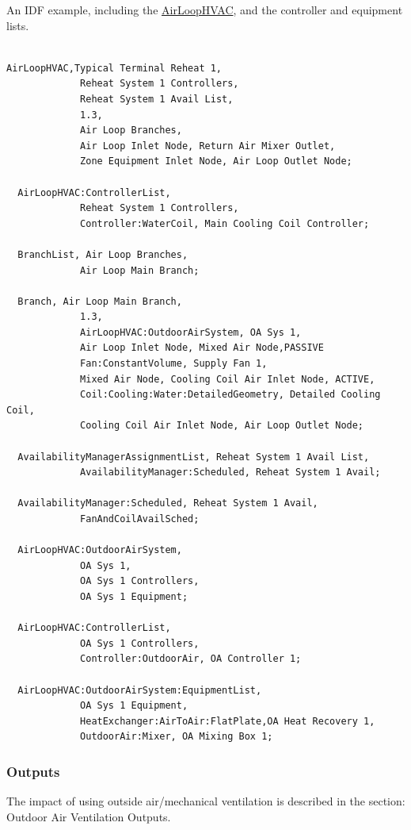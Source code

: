 An IDF example, including the \hyperref[airloophvac]{AirLoopHVAC}, and the controller and equipment lists.

\begin{lstlisting}

AirLoopHVAC,Typical Terminal Reheat 1,
             Reheat System 1 Controllers,
             Reheat System 1 Avail List,
             1.3,
             Air Loop Branches,
             Air Loop Inlet Node, Return Air Mixer Outlet,
             Zone Equipment Inlet Node, Air Loop Outlet Node;

  AirLoopHVAC:ControllerList,
             Reheat System 1 Controllers,
             Controller:WaterCoil, Main Cooling Coil Controller;

  BranchList, Air Loop Branches,
             Air Loop Main Branch;

  Branch, Air Loop Main Branch,
             1.3,
             AirLoopHVAC:OutdoorAirSystem, OA Sys 1,
             Air Loop Inlet Node, Mixed Air Node,PASSIVE
             Fan:ConstantVolume, Supply Fan 1,
             Mixed Air Node, Cooling Coil Air Inlet Node, ACTIVE,
             Coil:Cooling:Water:DetailedGeometry, Detailed Cooling Coil,
             Cooling Coil Air Inlet Node, Air Loop Outlet Node;

  AvailabilityManagerAssignmentList, Reheat System 1 Avail List,
             AvailabilityManager:Scheduled, Reheat System 1 Avail;

  AvailabilityManager:Scheduled, Reheat System 1 Avail,
             FanAndCoilAvailSched;

  AirLoopHVAC:OutdoorAirSystem,
             OA Sys 1,
             OA Sys 1 Controllers,
             OA Sys 1 Equipment;

  AirLoopHVAC:ControllerList,
             OA Sys 1 Controllers,
             Controller:OutdoorAir, OA Controller 1;

  AirLoopHVAC:OutdoorAirSystem:EquipmentList,
             OA Sys 1 Equipment,
             HeatExchanger:AirToAir:FlatPlate,OA Heat Recovery 1,
             OutdoorAir:Mixer, OA Mixing Box 1;
\end{lstlisting}

\subsubsection{Outputs}\label{outputs-2-001}

The impact of using outside air/mechanical ventilation is described in the section: Outdoor Air Ventilation Outputs.

